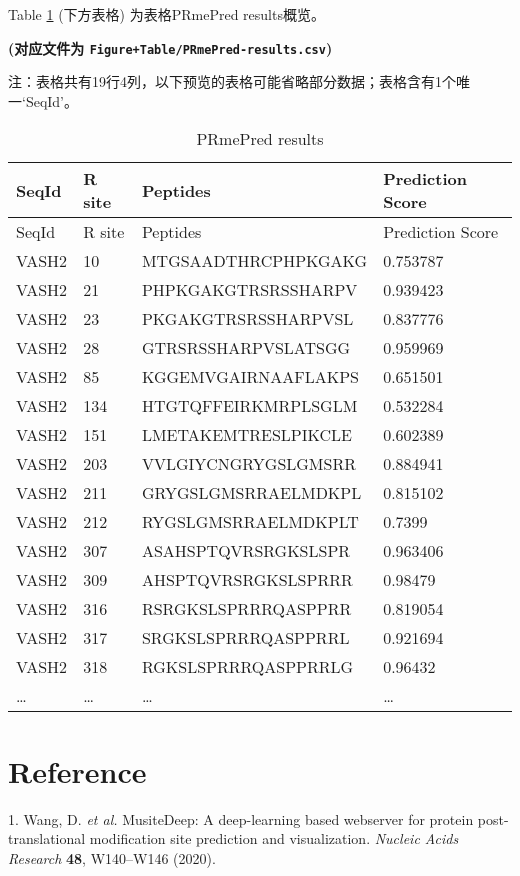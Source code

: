 \documentclass[
]{article}
\newenvironment{cslreferences}%
  {}%
  {\par}
\begin{document}
Table \ref{tab:PRmePred-results} (下方表格) 为表格PRmePred results概览。

\textbf{(对应文件为 \texttt{Figure+Table/PRmePred-results.csv})}

\begin{center}\begin{tcolorbox}[colback=gray!10, colframe=gray!50, width=0.9\linewidth, arc=1mm, boxrule=0.5pt]注：表格共有19行4列，以下预览的表格可能省略部分数据；表格含有1个唯一`SeqId'。
\end{tcolorbox}
\end{center}

\begin{longtable}[]{@{}llll@{}}
\caption{\label{tab:PRmePred-results}PRmePred results}\tabularnewline
\toprule
SeqId & R site & Peptides & Prediction Score\tabularnewline
\midrule
\endfirsthead
\toprule
SeqId & R site & Peptides & Prediction Score\tabularnewline
\midrule
\endhead
VASH2 & 10 & MTGSAADTHRCPHPKGAKG & 0.753787\tabularnewline
VASH2 & 21 & PHPKGAKGTRSRSSHARPV & 0.939423\tabularnewline
VASH2 & 23 & PKGAKGTRSRSSHARPVSL & 0.837776\tabularnewline
VASH2 & 28 & GTRSRSSHARPVSLATSGG & 0.959969\tabularnewline
VASH2 & 85 & KGGEMVGAIRNAAFLAKPS & 0.651501\tabularnewline
VASH2 & 134 & HTGTQFFEIRKMRPLSGLM & 0.532284\tabularnewline
VASH2 & 151 & LMETAKEMTRESLPIKCLE & 0.602389\tabularnewline
VASH2 & 203 & VVLGIYCNGRYGSLGMSRR & 0.884941\tabularnewline
VASH2 & 211 & GRYGSLGMSRRAELMDKPL & 0.815102\tabularnewline
VASH2 & 212 & RYGSLGMSRRAELMDKPLT & 0.7399\tabularnewline
VASH2 & 307 & ASAHSPTQVRSRGKSLSPR & 0.963406\tabularnewline
VASH2 & 309 & AHSPTQVRSRGKSLSPRRR & 0.98479\tabularnewline
VASH2 & 316 & RSRGKSLSPRRRQASPPRR & 0.819054\tabularnewline
VASH2 & 317 & SRGKSLSPRRRQASPPRRL & 0.921694\tabularnewline
VASH2 & 318 & RGKSLSPRRRQASPPRRLG & 0.96432\tabularnewline
\ldots{} & \ldots{} & \ldots{} & \ldots{}\tabularnewline
\bottomrule
\end{longtable}

\hypertarget{bibliography}{%
\section*{Reference}\label{bibliography}}

\hypertarget{refs}{}
\begin{cslreferences}
\leavevmode\hypertarget{ref-MusitedeepADWang2020}{}%
1. Wang, D. \emph{et al.} MusiteDeep: A deep-learning based webserver for protein post-translational modification site prediction and visualization. \emph{Nucleic Acids Research} \textbf{48}, W140--W146 (2020).
\end{cslreferences}
\end{document}
